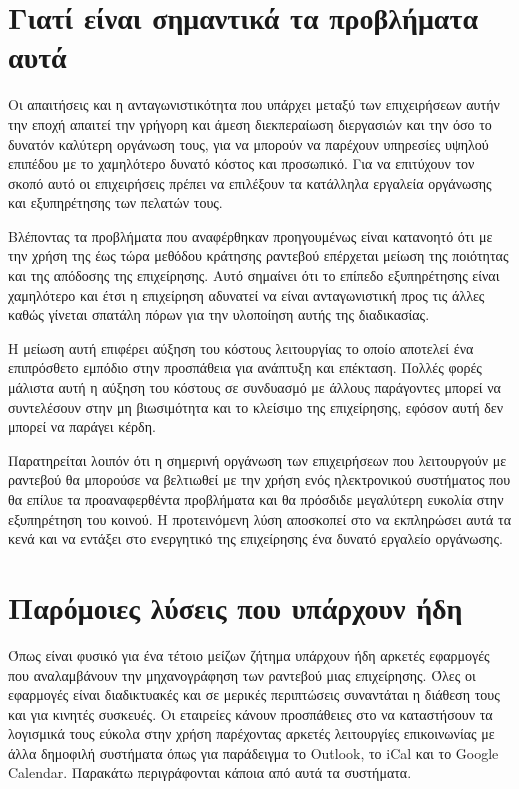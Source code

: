 \section {Γιατί είναι σημαντικά τα προβλήματα αυτά}
Οι απαιτήσεις και η ανταγωνιστικότητα που υπάρχει μεταξύ των επιχειρήσεων αυτήν την εποχή απαιτεί την γρήγορη και άμεση διεκπεραίωση διεργασιών και την όσο το δυνατόν καλύτερη οργάνωση τους, για να μπορούν να παρέχουν υπηρεσίες υψηλού επιπέδου με το χαμηλότερο δυνατό κόστος και προσωπικό. Για να επιτύχουν τον σκοπό αυτό οι επιχειρήσεις πρέπει να επιλέξουν τα κατάλληλα εργαλεία οργάνωσης και εξυπηρέτησης των πελατών τους.

Βλέποντας τα προβλήματα που αναφέρθηκαν προηγουμένως είναι κατανοητό ότι με την χρήση της έως τώρα μεθόδου κράτησης ραντεβού επέρχεται μείωση της ποιότητας και της απόδοσης της επιχείρησης. Αυτό σημαίνει ότι το επίπεδο εξυπηρέτησης είναι χαμηλότερο και έτσι η επιχείρηση αδυνατεί να είναι ανταγωνιστική προς τις άλλες καθώς γίνεται σπατάλη πόρων για την υλοποίηση αυτής της διαδικασίας.

Η μείωση αυτή επιφέρει αύξηση του κόστους λειτουργίας το οποίο αποτελεί ένα επιπρόσθετο εμπόδιο στην προσπάθεια για ανάπτυξη και επέκταση. Πολλές φορές μάλιστα αυτή η αύξηση του κόστους σε συνδυασμό με άλλους παράγοντες μπορεί να συντελέσουν στην μη βιωσιμότητα και το κλείσιμο της επιχείρησης, εφόσον αυτή δεν μπορεί να παράγει κέρδη.

Παρατηρείται λοιπόν ότι η σημερινή οργάνωση των επιχειρήσεων που λειτουργούν με ραντεβού θα μπορούσε να βελτιωθεί με την χρήση ενός ηλεκτρονικού συστήματος που θα επίλυε τα προαναφερθέντα προβλήματα και θα πρόσδιδε μεγαλύτερη ευκολία στην εξυπηρέτηση του κοινού. Η προτεινόμενη λύση αποσκοπεί στο να εκπληρώσει αυτά τα κενά και να εντάξει στο ενεργητικό της επιχείρησης ένα δυνατό εργαλείο οργάνωσης.

\section{Παρόμοιες λύσεις που υπάρχουν ήδη}
Όπως είναι φυσικό για ένα τέτοιο μείζων ζήτημα υπάρχουν ήδη αρκετές εφαρμογές που αναλαμβάνουν την μηχανογράφηση των ραντεβού μιας επιχείρησης. Όλες οι εφαρμογές είναι διαδικτυακές και σε μερικές περιπτώσεις συναντάται η διάθεση τους και για κινητές συσκευές. Οι εταιρείες κάνουν προσπάθειες στο να καταστήσουν τα λογισμικά τους εύκολα στην χρήση παρέχοντας αρκετές λειτουργίες επικοινωνίας με άλλα δημοφιλή συστήματα όπως για παράδειγμα το Outlook, το iCal και το Google Calendar. Παρακάτω περιγράφονται κάποια από αυτά τα συστήματα.

